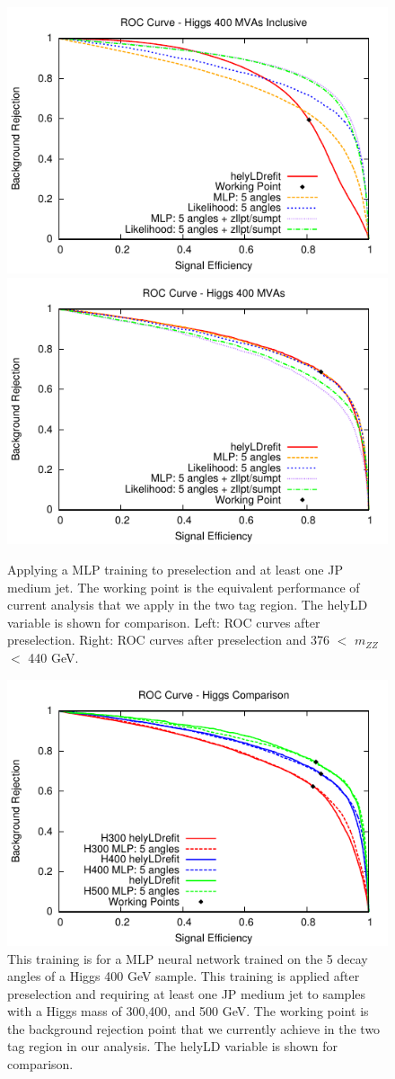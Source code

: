 \begin{figure}[htb!]
\begin{center}
\centerline{
\includegraphics[width=0.5\linewidth]{Optimization/plots/NN/pretag_ROC_400.pdf}
\includegraphics[width=0.5\linewidth]{Optimization/plots/NN/pretag_ROC_400_wincut.pdf}
}
\caption{Applying a MLP training to preselection and at least one JP medium jet.  The working point is the equivalent performance of current analysis that we apply in the two tag region. The helyLD variable is shown for comparison. Left: ROC curves after preselection.  Right: ROC curves after preselection and 376 $<$ $m_{ZZ}$ $<$ 440 GeV.
}
\label{fig:zllptzumpt2}
\end{center}
\end{figure}

\begin{figure}[htb!]
\begin{center}
\centerline{
\includegraphics[width=0.6\linewidth]{Optimization/plots/NN/pretag_ROC_wincut.pdf}
}
\caption{
This training is for a MLP neural network trained on the 5 decay angles of a Higgs 400 GeV sample. This training is applied after preselection and requiring at least one JP medium jet to samples with a Higgs mass of 300,400, and 500 GeV. The working point is the background rejection point that we currently achieve in the two tag region in our analysis. The helyLD variable is shown for comparison.
}
\label{fig:nn_allhiggs}
\end{center}
\end{figure}




